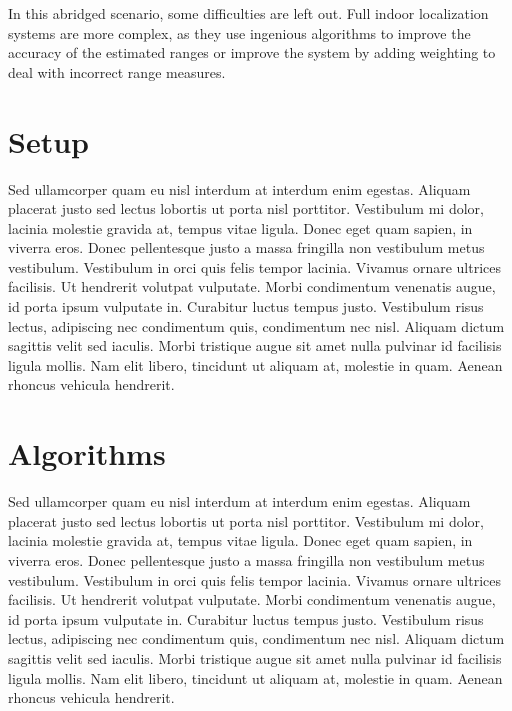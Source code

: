 In this abridged scenario, some difficulties are left out. Full indoor localization systems are more complex, as they use ingenious algorithms to improve the accuracy of the estimated ranges or improve the system by adding weighting to deal with incorrect range measures.



\section{Setup}

Sed ullamcorper quam eu nisl interdum at interdum enim egestas. Aliquam placerat justo sed lectus lobortis ut porta nisl porttitor. Vestibulum mi dolor, lacinia molestie gravida at, tempus vitae ligula. Donec eget quam sapien, in viverra eros. Donec pellentesque justo a massa fringilla non vestibulum metus vestibulum. Vestibulum in orci quis felis tempor lacinia. Vivamus ornare ultrices facilisis. Ut hendrerit volutpat vulputate. Morbi condimentum venenatis augue, id porta ipsum vulputate in. Curabitur luctus tempus justo. Vestibulum risus lectus, adipiscing nec condimentum quis, condimentum nec nisl. Aliquam dictum sagittis velit sed iaculis. Morbi tristique augue sit amet nulla pulvinar id facilisis ligula mollis. Nam elit libero, tincidunt ut aliquam at, molestie in quam. Aenean rhoncus vehicula hendrerit.


\section{Algorithms}

Sed ullamcorper quam eu nisl interdum at interdum enim egestas. Aliquam placerat justo sed lectus lobortis ut porta nisl porttitor. Vestibulum mi dolor, lacinia molestie gravida at, tempus vitae ligula. Donec eget quam sapien, in viverra eros. Donec pellentesque justo a massa fringilla non vestibulum metus vestibulum. Vestibulum in orci quis felis tempor lacinia. Vivamus ornare ultrices facilisis. Ut hendrerit volutpat vulputate. Morbi condimentum venenatis augue, id porta ipsum vulputate in. Curabitur luctus tempus justo. Vestibulum risus lectus, adipiscing nec condimentum quis, condimentum nec nisl. Aliquam dictum sagittis velit sed iaculis. Morbi tristique augue sit amet nulla pulvinar id facilisis ligula mollis. Nam elit libero, tincidunt ut aliquam at, molestie in quam. Aenean rhoncus vehicula hendrerit.